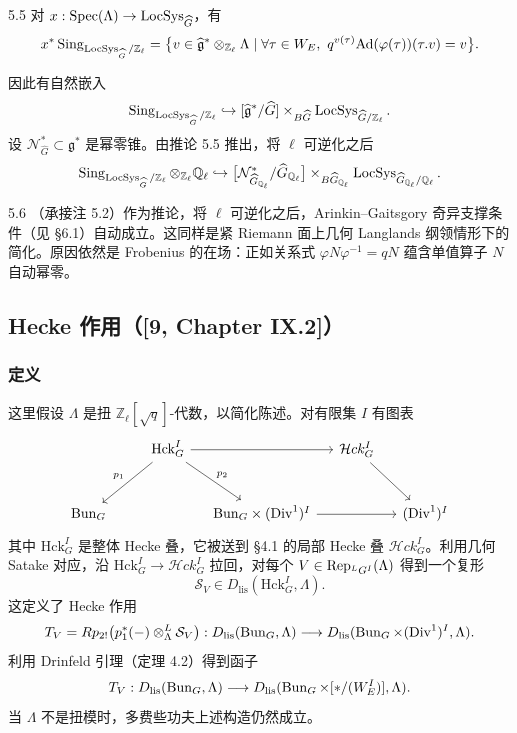 \begin{cor}{5.5}
对 $x:\operatorname{Spec}(\Lambda)\to\operatorname{LocSys}_{\widehat{G}}$，有
\[
x^{*}\operatorname{Sing}_{\operatorname{LocSys}_{\widehat{G}}/\mathbb{Z}_{\ell}}=\bigl\{v\in\widehat{\mathfrak{g}}^{*}\otimes_{\mathbb{Z}_{\ell}}\Lambda\mid\forall\tau\in W_{E},\ q^{v(\tau)}\mathrm{Ad}(\varphi(\tau))(\tau.v)=v\bigr\}.
\]
\label{cor:a3-5-5}
\end{cor}

因此有自然嵌入
\[
\operatorname{Sing}_{\operatorname{LocSys}_{\widehat{G}}/\mathbb{Z}_{\ell}}\hookrightarrow[\widehat{\mathfrak{g}}^{*}/\widehat{G}]\times_{B\widehat{G}}\operatorname{LocSys}_{\widehat{G}/\mathbb{Z}_{\ell}}.
\]
设 $\mathcal{N}^{*}_{\widehat{G}}\subset\mathfrak{g}^{*}$ 是幂零锥。由推论 5.5 推出，将 $\ell$ 可逆化之后
\[
\operatorname{Sing}_{\operatorname{LocSys}_{\widehat{G}}/\mathbb{Z}_{\ell}}\otimes_{\mathbb{Z}_{\ell}}\mathbb{Q}_{\ell}\hookrightarrow\bigl[\mathcal{N}^{*}_{\widehat{G}_{\mathbb{Q}_{\ell}}}/\widehat{G}_{\mathbb{Q}_{\ell}}\bigr]\times_{B\widehat{G}_{\mathbb{Q}_{\ell}}}\operatorname{LocSys}_{\widehat{G}_{\mathbb{Q}_{\ell}}/\mathbb{Q}_{\ell}}.
\]

\begin{rem}{5.6}
（承接注 5.2）作为推论，将 $\ell$ 可逆化之后，Arinkin–Gaitsgory 奇异支撑条件（见 §6.1）自动成立。这同样是紧 Riemann 面上几何 Langlands 纲领情形下的简化。原因依然是 Frobenius 的在场：正如关系式 $\varphi N\varphi^{-1}=qN$ 蕴含单值算子 $N$ 自动幂零。
\label{rem:a3-5-6}
\end{rem}

\subsection{Hecke 作用（[9, Chapter IX.2]）}
\subsubsection{定义}
这里假设 $\Lambda$ 是扭 $\mathbb{Z}_{\ell}[\sqrt{q}]$-代数，以简化陈述。对有限集 $I$ 有图表
\[
\begin{tikzcd}[column sep=small,row sep=large]
& & \mathrm{Hck}^{I}_{G} \arrow[rr] \arrow[dll, "p_{1}"'] \arrow[dr, "p_{2}"] & & \mathcal{H}ck^{I}_{G} \arrow[dr] & \\
\mathrm{Bun}_{G} & & & \mathrm{Bun}_{G}\times(\mathrm{Div}^{1})^{I} \arrow[rr] & & (\mathrm{Div}^{1})^{I}
\end{tikzcd}
\]
其中 $\mathrm{Hck}^{I}_{G}$ 是整体 Hecke 叠，它被送到 §4.1 的局部 Hecke 叠 $\mathcal{H}ck^{I}_{G}$。利用几何 Satake 对应，沿 $\mathrm{Hck}^{I}_{G}\to\mathcal{H}ck^{I}_{G}$ 拉回，对每个 $V\in\operatorname{Rep}_{{}^{L}G^{I}}(\Lambda)$ 得到一个复形
\[
\mathcal{S}_{V}\in D_{\mathrm{lis}}(\mathrm{Hck}^{I}_{G},\Lambda).
\]
这定义了 Hecke 作用
\[
T_{V}=Rp_{2!}\bigl(p_{1}^{*}(-)\otimes^{L}_{\Lambda}\mathcal{S}_{V}\bigr):D_{\mathrm{lis}}(\operatorname{Bun}_{G},\Lambda)\longrightarrow D_{\mathrm{lis}}(\operatorname{Bun}_{G}\times(\mathrm{Div}^{1})^{I},\Lambda).
\]
利用 Drinfeld 引理（定理 4.2）得到函子
\[
T_{V}:D_{\mathrm{lis}}(\operatorname{Bun}_{G},\Lambda)\longrightarrow D_{\mathrm{lis}}(\operatorname{Bun}_{G}\times[*/(W^{I}_{E})],\Lambda).
\]
当 $\Lambda$ 不是扭模时，多费些功夫上述构造仍然成立。

